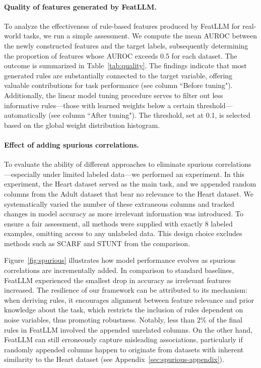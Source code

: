 \vspace*{-0.12in}
\paragraph{Quality of features generated by \textsf{FeatLLM}.}
To analyze the effectiveness of rule-based features produced by \textsf{FeatLLM} for real-world tasks, we run a simple assessment. We compute the mean AUROC between the newly constructed features and the target labels, subsequently determining the proportion of features whose AUROC exceeds 0.5 for each dataset. The outcome is summarized in Table~\ref{tab:quality}. The findings indicate that most generated rules are substantially connected to the target variable, offering valuable contributions for task performance (see column ``Before tuning"). Additionally, the linear model tuning procedure serves to filter out less informative rules—those with learned weights below a certain threshold—automatically (see column ``After tuning"). The threshold, set at 0.1, is selected based on the global weight distribution histogram.

\vspace*{-0.12in}
\paragraph{Effect of adding spurious correlations.} To evaluate the ability of different approaches to eliminate spurious correlations—especially under limited labeled data—we performed an experiment. In this experiment, the Heart dataset served as the main task, and we appended random columns from the Adult dataset that bear no relevance to the Heart dataset. We systematically varied the number of these extraneous columns and tracked changes in model accuracy as more irrelevant information was introduced. To ensure a fair assessment, all methods were supplied with exactly 8 labeled examples, omitting access to any unlabeled data. This design choice excludes methods such as SCARF and STUNT from the comparison.

Figure~\ref{fig:spurious} illustrates how model performance evolves as spurious correlations are incrementally added. In comparison to standard baselines, \textsf{FeatLLM} experienced the smallest drop in accuracy as irrelevant features increased. The resilience of our framework can be attributed to its mechanism: when deriving rules, it encourages alignment between feature relevance and prior knowledge about the task, which restricts the inclusion of rules dependent on noise variables, thus promoting robustness. Notably, less than 2\% of the final rules in \textsf{FeatLLM} involved the appended unrelated columns. On the other hand, \textsf{FeatLLM} can still erroneously capture misleading associations, particularly if randomly appended columns happen to originate from datasets with inherent similarity to the Heart dataset (see Appendix~\ref{sec:spurious-appendix}).

